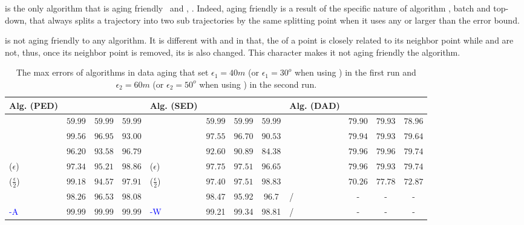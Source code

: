 {%



 \dpa is the only algorithm that is aging friendly \wrt ~\ped and \sed, . Indeed, {aging friendly} is a result of the {specific nature} of algorithm \dpa, \ie batch and top-down, that always splits a trajectory into two sub trajectories by the same splitting point when it uses any \ped or \sed larger than the error bound.

 \dad is not aging friendly \wrt to any algorithm. It is different with \ped and \sed in that, the \dad of a point is closely related to its neighbor point while \ped and \sed are not, thus, once its neighbor point is removed, its \dad is also changed. This character makes it not aging friendly \wrt the \dpa algorithm.


\begin{table}
	\caption{\small The max errors of algorithms in data aging that set $\epsilon_1=40m$ (or $\epsilon_1=30^o$ when using \dad) in the first run and $\epsilon_2=60m$ (or $\epsilon_2=50^o$ when using \dad) in the second run.}
	\centering
	\scriptsize
	\vspace{-1ex}
	\begin{tabular}{|l|c|c|c|l|c|c|c|l|c|c|c|}
		\hline
		\bf{Alg. (PED)}  &\ucar &\geolife &\mopsi & \bf{Alg. (SED)}  &\ucar &\geolife &\mopsi &\bf{Alg. (DAD)}  &\ucar &\geolife &\mopsi \\
		\hline
		{\dpa} &	$59.99$ & $59.99 $ &	$59.99$	&\dpa &$59.99$ &$59.99$ & $59.99$ & \dpa	& $79.90$	& $79.93$	& $78.96 $ \\
		\hline
		{\tpa} &	$99.56$ & $96.95$ &	$93.00$	&\tpa 	& $97.55$& $96.70$ &$90.53$ & \tpa	& $79.94$	& $79.93$	& $79.64$ \\
		\hline
		{\bqsa} &	$96.20 $ & $93.58  $ &	$96.79 $	&\squishe &$92.60$ &$90.89$ & $84.38$ & \opwa	& $79.96$	& $79.96$	& $79.74$ \\
		\hline
		{\siped($\epsilon$)} &	$97.34   $ & $95.21  $ &	$98.86   $	&\cised($\epsilon$) & $97.75$ &$97.51$ &$96.65$ & \interval	& $79.96$	& $79.93$	& $79.74$ \\
		\hline
		{\siped($\frac{\epsilon}{2}$)} &	$99.18  $ & $94.57  $ &	$97.91  $ &\cised($\frac{\epsilon}{2}$) &$ 97.40 $ & $97.51$ & $98.83$& \intersec	& $70.26 $	& $77.78$	& $72.87$ \\
		\hline
		{\operb} &	${98.26} $ & ${96.53} $ & ${98.08} $	& \textcolor{blue}{\dagots} &98.47 &95.92 &96.7 & / &- &- &- \\
		\hline
		\textcolor{blue}{\operb-A} &	${99.99} $ & ${99.99} $ & ${99.99} $	& \textcolor{blue}{\cised-W} &99.21 &99.34 &98.81 & / &- &- &- \\
		\hline
	\end{tabular}
	\label{tab:aging-me}


\end{table}}
